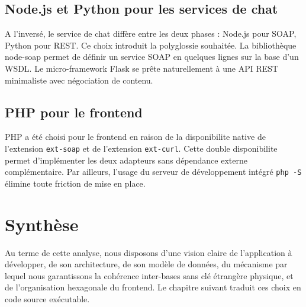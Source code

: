 \subsection{Node.js et Python pour les services de chat}

A l'inversé, le service de chat diffère entre les deux phases : Node.js pour SOAP, Python pour REST. Ce choix introduit la polyglossie souhaitée. La bibliothèque node-soap \citep{nodesoap} permet de définir un service SOAP en quelques lignes sur la base d'un WSDL. Le micro-framework Flask \citep{flask} se prête naturellement à une API REST minimaliste avec négociation de contenu.

\subsection{PHP pour le frontend}

PHP a été choisi pour le frontend en raison de la disponibilite native de l'extension \texttt{ext-soap} et de l'extension \texttt{ext-curl}. Cette double disponibilite permet d'implémenter les deux adapteurs sans dépendance externe complémentaire. Par ailleurs, l'usage du serveur de développement intégré \texttt{php -S} élimine toute friction de mise en place.

\section{Synthèse}

Au terme de cette analyse, nous disposons d'une vision claire de l'application à développer, de son architecture, de son modèle de données, du mécanisme par lequel nous garantissons la cohérence inter-bases sans clé étrangère physique, et de l'organisation hexagonale du frontend. Le chapitre suivant traduit ces choix en code source exécutable.
